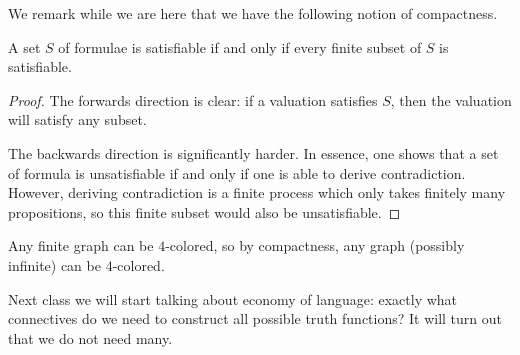 \documentclass[../notes.tex]{subfiles}
\begin{document}
We remark while we are here that we have the following notion of compactness.
\begin{theorem}[Compactness]
	A set $S$ of formulae is satisfiable if and only if every finite subset of $S$ is satisfiable.
\end{theorem}
\begin{proof}
	The forwards direction is clear: if a valuation satisfies $S$, then the valuation will satisfy any subset.

	The backwards direction is significantly harder. In essence, one shows that a set of formula is unsatisfiable if and only if one is able to derive contradiction. However, deriving contradiction is a finite process which only takes finitely many propositions, so this finite subset would also be unsatisfiable.
\end{proof}
\begin{example}
	Any finite graph can be $4$-colored, so by compactness, any graph (possibly infinite) can be $4$-colored.
\end{example}
Next class we will start talking about economy of language: exactly what connectives do we need to construct all possible truth functions? It will turn out that we do not need many.
\end{document}
